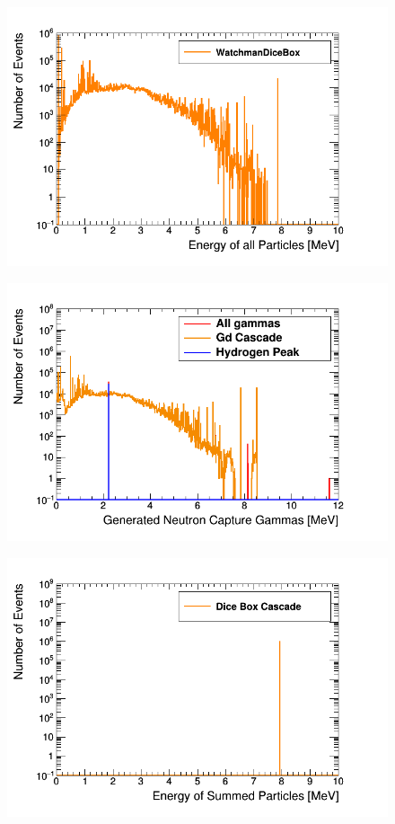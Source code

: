 \begin{figure}[htbp]
 \centering
 \includegraphics[width=0.7\linewidth]{Chapter4/Figs/Raster/gadolinium/energyOfCascadeOfCascadeGd.png}
 \label{fig:energyOfCascadeOfCascadeGd}
\end{figure}

\begin{figure}[htbp]
 \centering
 \includegraphics[width=0.7\linewidth]{Chapter4/Figs/Raster/gadolinium/gdCascadeVsAllGammas.png}
 \label{fig:gdCascadeVsAllGammas}
\end{figure}

\begin{figure}[htbp]
 \centering
 \includegraphics[width=0.7\linewidth]{Chapter4/Figs/Raster/gadolinium/conservationOfCascadeGd.png}
 \label{fig:conservationOfCascadeGd}
\end{figure}


